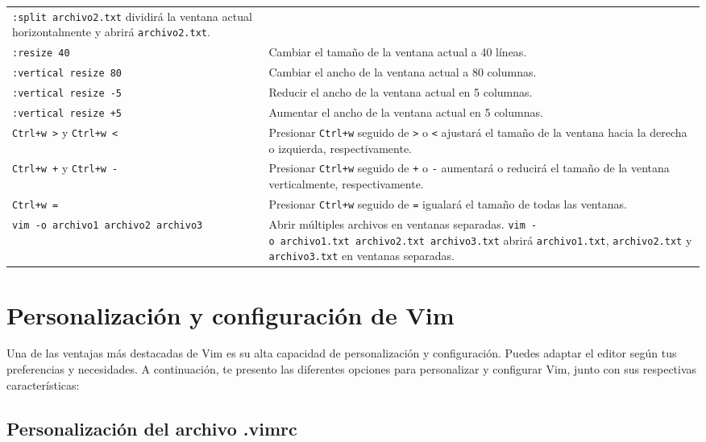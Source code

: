 \documentclass[
  doc,
  floatsintext,
  longtable,
  a4paper,
  nolmodern,
  notxfonts,
  notimes,
  12pt,
  colorlinks=true,linkcolor=blue,citecolor=blue,urlcolor=blue]{apa7}
\begin{document}
{\begin{longtable}[]{@{}
  >{\raggedright\arraybackslash}p{}
  >{\raggedright\arraybackslash}p{}@{}}
\texttt{:split\ archivo2.txt} dividirá la ventana actual horizontalmente
y abrirá \texttt{archivo2.txt}. \\
\texttt{:resize\ 40} & Cambiar el tamaño de la ventana actual a 40
líneas. \\
\texttt{:vertical\ resize\ 80} & Cambiar el ancho de la ventana actual a
80 columnas. \\
\texttt{:vertical\ resize\ -5} & Reducir el ancho de la ventana actual
en 5 columnas. \\
\texttt{:vertical\ resize\ +5} & Aumentar el ancho de la ventana actual
en 5 columnas. \\
\texttt{Ctrl+w\ \textgreater{}} y \texttt{Ctrl+w\ \textless{}} &
Presionar \texttt{Ctrl+w} seguido de \texttt{\textgreater{}} o
\texttt{\textless{}} ajustará el tamaño de la ventana hacia la derecha o
izquierda, respectivamente. \\
\texttt{Ctrl+w\ +} y \texttt{Ctrl+w\ -} & Presionar \texttt{Ctrl+w}
seguido de \texttt{+} o \texttt{-} aumentará o reducirá el tamaño de la
ventana verticalmente, respectivamente. \\
\texttt{Ctrl+w\ =} & Presionar \texttt{Ctrl+w} seguido de \texttt{=}
igualará el tamaño de todas las ventanas. \\
\texttt{vim\ -o\ archivo1\ archivo2\ archivo3} & Abrir múltiples
archivos en ventanas separadas.
\texttt{vim\ -o\ archivo1.txt\ archivo2.txt\ archivo3.txt} abrirá
\texttt{archivo1.txt}, \texttt{archivo2.txt} y \texttt{archivo3.txt} en
ventanas separadas. \\
\end{longtable}
}

\section{Personalización y configuración de
Vim}\label{personalizaciuxf3n-y-configuraciuxf3n-de-vim}

Una de las ventajas más destacadas de Vim es su alta capacidad de
personalización y configuración. Puedes adaptar el editor según tus
preferencias y necesidades. A continuación, te presento las diferentes
opciones para personalizar y configurar Vim, junto con sus respectivas
características:

\subsection{Personalización del archivo
.vimrc}\label{personalizaciuxf3n-del-archivo-.vimrc}
\end{document}
